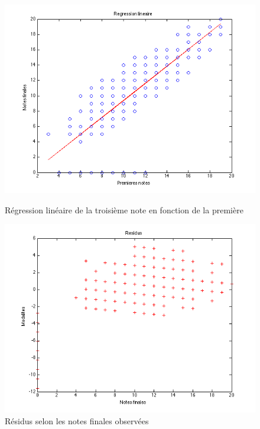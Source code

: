 \documentclass[11pt]{article}
\begin{document}
\begin{figure}[h]
\centering
\includegraphics[scale=0.5]{Images/fig6.png}
\caption{Régression linéaire de la troisième note en fonction de la première}
\includegraphics[scale=0.5]{Images/fig7.png}
\caption{Résidus selon les notes finales observées}
\end{figure}
\end{document}
